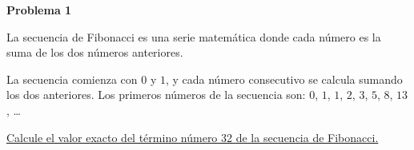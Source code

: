 \begin{center}
\Large \textbf{Problema 1}
\end{center}

La secuencia de Fibonacci es una serie matemática donde cada número es la suma de los dos números anteriores.

\bigskip

La secuencia comienza con $0$ y $1$, y cada número consecutivo se calcula sumando los dos anteriores.
Los primeros números de la secuencia son: $0$, $1$, $1$, $2$, $3$, $5$, $8$, $13$, \ldots

\bigskip

\underline{Calcule el valor exacto del término número 32 de la secuencia de Fibonacci.}

